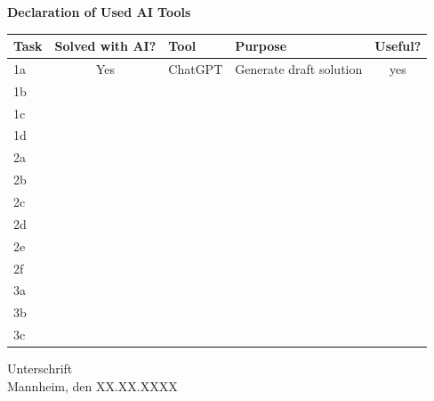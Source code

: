 %
%
%
\begin{center}
  \textbf{Declaration of Used AI Tools} \\[.3em]
  \begin{tabularx}{\textwidth}{lclXc}
    \toprule
    Task & Solved with AI? & Tool & Purpose & Useful? \\
    \midrule
    1a & Yes & ChatGPT & Generate draft solution & yes \\
    1b \\
    1c \\
    1d \\
    2a \\
    2b \\
    2c \\
    2d \\
    2e \\
    2f \\
    3a \\
    3b \\
    3c \\
    \bottomrule
  \end{tabularx}
\end{center}

\vspace{2cm}
\noindent Unterschrift\\
\noindent Mannheim, den XX.XX.XXXX \hfill
